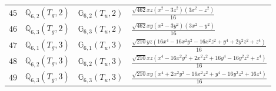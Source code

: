 \documentclass[fleqn,8pt,landscape]{jsarticle}
\begin{document}
\begin{table}[ht!]
\begin{center}
\begin{tabular}{cccl}
$ 45 $ & $ \mathbb{Q}_{6,2}(T_{g},2) $ & $ \mathbb{G}_{6,2}(T_{u},2) $ & $ \frac{\sqrt{462} x z \left(x^{2} - 3 z^{2}\right) \left(3 x^{2} - z^{2}\right)}{16} $ \\
$ 46 $ & $ \mathbb{Q}_{6,3}(T_{g},2) $ & $ \mathbb{G}_{6,3}(T_{u},2) $ & $ \frac{\sqrt{462} x y \left(x^{2} - 3 y^{2}\right) \left(3 x^{2} - y^{2}\right)}{16} $ \\
$ 47 $ & $ \mathbb{Q}_{6,1}(T_{g},3) $ & $ \mathbb{G}_{6,1}(T_{u},3) $ & $ \frac{\sqrt{210} y z \left(16 x^{4} - 16 x^{2} y^{2} - 16 x^{2} z^{2} + y^{4} + 2 y^{2} z^{2} + z^{4}\right)}{16} $ \\
$ 48 $ & $ \mathbb{Q}_{6,2}(T_{g},3) $ & $ \mathbb{G}_{6,2}(T_{u},3) $ & $ \frac{\sqrt{210} x z \left(x^{4} - 16 x^{2} y^{2} + 2 x^{2} z^{2} + 16 y^{4} - 16 y^{2} z^{2} + z^{4}\right)}{16} $ \\
$ 49 $ & $ \mathbb{Q}_{6,3}(T_{g},3) $ & $ \mathbb{G}_{6,3}(T_{u},3) $ & $ \frac{\sqrt{210} x y \left(x^{4} + 2 x^{2} y^{2} - 16 x^{2} z^{2} + y^{4} - 16 y^{2} z^{2} + 16 z^{4}\right)}{16} $ \\
 \hline \hline
\end{tabular}
\end{center}
\end{table}
\end{document}
